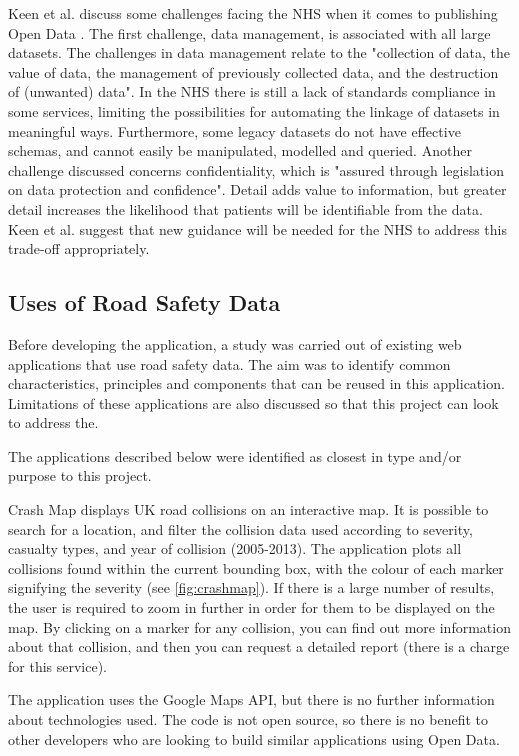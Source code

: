 \documentclass[authoryearcitations]{UoYCSproject}
\begin{document}
Keen et al. discuss some challenges facing the NHS when it comes to publishing Open Data \citep{Keen2013}. The first challenge, data management, is associated with all large datasets. The challenges in data management relate to the "collection of data, the value of data, the management of previously collected data, and the destruction of (unwanted) data". In the NHS there is still a lack of standards compliance in some services, limiting the possibilities for automating the linkage of datasets in meaningful ways. Furthermore, some legacy datasets do not have effective schemas, and cannot easily be manipulated, modelled and queried. Another challenge discussed concerns confidentiality, which is "assured through legislation on data protection and confidence".  Detail adds value to information, but greater detail increases the likelihood that patients will be identifiable from the data. Keen et al. suggest that new guidance will be needed for the NHS to address this trade-off appropriately.

\subsection{Uses of Road Safety Data}

Before developing the application, a study was carried out of existing web applications that use road safety data. The aim was to identify common characteristics, principles and components that can be reused in this application. Limitations of these applications are also discussed so that this project can look to address the.

The applications described below were identified as closest in type and/or purpose to this project.
 
Crash Map \citep{crashmap} displays UK road collisions on an interactive map. It is possible to search for a location, and filter the collision data used according to severity, casualty types, and year of collision (2005-2013). The application plots all collisions found within the current bounding box, with the colour of each marker signifying the severity (see \autoref{fig:crashmap}). If there is a large number of results, the user is required to zoom in further in order for them to be displayed on the map. By clicking on a marker for any collision, you can find out more information about that collision, and then you can request a detailed report (there is a charge for this service).

The application uses the Google Maps API, but there is no further information about technologies used. The code is not open source, so there is no benefit to other developers who are looking to build similar applications using Open Data. 
\end{document}

